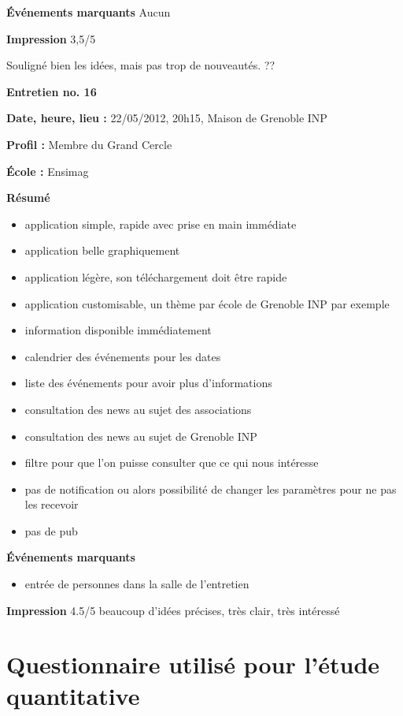 \documentclass[a4paper, 11px]{article}
\begin{document}
\textbf{Événements marquants}
Aucun

\textbf{Impression}
3,5/5

Souligné bien les idées, mais pas trop de nouveautés.
??


\vspace{.3cm}

 \textbf {\large Entretien no. 16}

\textbf{Date, heure, lieu : }
22/05/2012, 20h15, Maison de Grenoble INP

\textbf{Profil : }
Membre du Grand Cercle

\textbf{École : }
Ensimag

\textbf{Résumé}
	\begin{itemize}
		\item application simple, rapide avec prise en main immédiate
		\item application belle graphiquement
		\item application légère, son téléchargement doit être rapide
		\item application customisable, un thème par école de Grenoble INP par exemple
		\item information disponible immédiatement
		\item calendrier des événements pour les dates
		\item liste des événements pour avoir plus d'informations
		\item consultation des news au sujet des associations
		\item consultation des news au sujet de Grenoble INP
		\item filtre pour que l'on puisse consulter que ce qui nous intéresse
		\item pas de notification ou alors possibilité de changer les paramètres pour ne pas les recevoir
		\item pas de pub
	\end{itemize}

\vspace{.25cm}
\textbf{Événements marquants}
	\begin{itemize}
		\item entrée de personnes dans la salle de l'entretien
	\end{itemize}

\vspace{.25cm}
\textbf{Impression} 4.5/5 beaucoup d'idées précises, très clair, très intéressé

\newpage

\section{Questionnaire utilisé pour l'étude quantitative}
\end{document}
